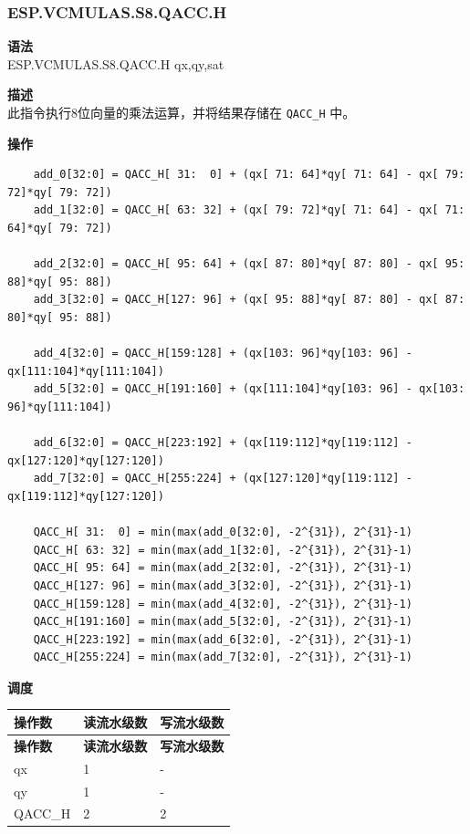 \newpage
\subsubsection{ESP.VCMULAS.S8.QACC.H}\label{instruction:ESPVCMULASS8QACC_H}
\textbf{语法}\\
ESP.VCMULAS.S8.QACC.H qx,qy,sat

\textbf{描述}\\
此指令执行8位向量的乘法运算，并将结果存储在 \lstinline{QACC_H} 中。

\textbf{操作}\\
\begin{lstlisting}
    add_0[32:0] = QACC_H[ 31:  0] + (qx[ 71: 64]*qy[ 71: 64] - qx[ 79: 72]*qy[ 79: 72])
    add_1[32:0] = QACC_H[ 63: 32] + (qx[ 79: 72]*qy[ 71: 64] - qx[ 71: 64]*qy[ 79: 72])

    add_2[32:0] = QACC_H[ 95: 64] + (qx[ 87: 80]*qy[ 87: 80] - qx[ 95: 88]*qy[ 95: 88])
    add_3[32:0] = QACC_H[127: 96] + (qx[ 95: 88]*qy[ 87: 80] - qx[ 87: 80]*qy[ 95: 88])

    add_4[32:0] = QACC_H[159:128] + (qx[103: 96]*qy[103: 96] - qx[111:104]*qy[111:104])
    add_5[32:0] = QACC_H[191:160] + (qx[111:104]*qy[103: 96] - qx[103: 96]*qy[111:104])

    add_6[32:0] = QACC_H[223:192] + (qx[119:112]*qy[119:112] - qx[127:120]*qy[127:120])
    add_7[32:0] = QACC_H[255:224] + (qx[127:120]*qy[119:112] - qx[119:112]*qy[127:120])

    QACC_H[ 31:  0] = min(max(add_0[32:0], -2^{31}), 2^{31}-1)
    QACC_H[ 63: 32] = min(max(add_1[32:0], -2^{31}), 2^{31}-1)
    QACC_H[ 95: 64] = min(max(add_2[32:0], -2^{31}), 2^{31}-1)
    QACC_H[127: 96] = min(max(add_3[32:0], -2^{31}), 2^{31}-1)
    QACC_H[159:128] = min(max(add_4[32:0], -2^{31}), 2^{31}-1)
    QACC_H[191:160] = min(max(add_5[32:0], -2^{31}), 2^{31}-1)
    QACC_H[223:192] = min(max(add_6[32:0], -2^{31}), 2^{31}-1)
    QACC_H[255:224] = min(max(add_7[32:0], -2^{31}), 2^{31}-1)

\end{lstlisting}

\textbf{调度}\\
\begin{longtable}[c]{|l|l|l|}
    \hline
    \rowcolor{lightgray}
    \textbf{操作数} & \textbf{读流水级数} & \textbf{写流水级数} \\\hline
    \endfirsthead
    \hline
    \rowcolor{lightgray}
     \textbf{操作数} & \textbf{读流水级数} & \textbf{写流水级数} \\\hline
    \endhead
    \hline
    \endfoot

     qx & 1 & - \\\hline
     qy & 1 & - \\\hline
     QACC\_H & 2 & 2

\end{longtable}

